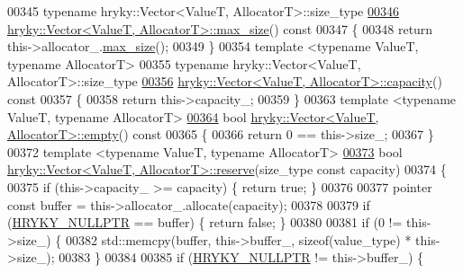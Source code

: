 \begin{DoxyCode}
00345 \textcolor{keyword}{typename} hryky::Vector<ValueT, AllocatorT>::size\_type
\hypertarget{vector_8h_source_l00346}{}\hyperlink{classhryky_1_1_vector_a21d0f3baf14bced98efbf2c23790fd95}{00346} \hyperlink{classhryky_1_1_vector}{hryky::Vector<ValueT, AllocatorT>::max_size}()\textcolor{keyword}{ const}
00347 \textcolor{keyword}{}\{
00348     \textcolor{keywordflow}{return} this->allocator\_.\hyperlink{classhryky_1_1_vector_a21d0f3baf14bced98efbf2c23790fd95}{max_size}();
00349 \}
00354 \textcolor{keyword}{template} <\textcolor{keyword}{typename} ValueT, \textcolor{keyword}{typename} AllocatorT>
00355 \textcolor{keyword}{typename} hryky::Vector<ValueT, AllocatorT>::size\_type
\hypertarget{vector_8h_source_l00356}{}\hyperlink{classhryky_1_1_vector_a0865b1eec33d6dfe008eb7c24afd5f97}{00356} \hyperlink{classhryky_1_1_vector}{hryky::Vector<ValueT, AllocatorT>::capacity}()\textcolor{keyword}{ const}
00357 \textcolor{keyword}{}\{
00358     \textcolor{keywordflow}{return} this->capacity\_;
00359 \}
00363 \textcolor{keyword}{template} <\textcolor{keyword}{typename} ValueT, \textcolor{keyword}{typename} AllocatorT>
\hypertarget{vector_8h_source_l00364}{}\hyperlink{classhryky_1_1_vector_a0aec03015ecda2ed9e59f7a95ee2c81a}{00364} \textcolor{keywordtype}{bool} \hyperlink{classhryky_1_1_vector}{hryky::Vector<ValueT, AllocatorT>::empty}()\textcolor{keyword}{ const}
00365 \textcolor{keyword}{}\{
00366     \textcolor{keywordflow}{return} 0 == this->size\_;
00367 \}
00372 \textcolor{keyword}{template} <\textcolor{keyword}{typename} ValueT, \textcolor{keyword}{typename} AllocatorT>
\hypertarget{vector_8h_source_l00373}{}\hyperlink{classhryky_1_1_vector_a4d2a2874dcc88826b45782d4b1b73051}{00373} \textcolor{keywordtype}{bool} \hyperlink{classhryky_1_1_vector}{hryky::Vector<ValueT, AllocatorT>::reserve}(size\_type \textcolor{keyword}{const} capacity)
00374 \{
00375     \textcolor{keywordflow}{if} (this->capacity\_ >= capacity) \{ \textcolor{keywordflow}{return} \textcolor{keyword}{true}; \}
00376 
00377     pointer \textcolor{keyword}{const} buffer = this->allocator\_.allocate(capacity);
00378 
00379     \textcolor{keywordflow}{if} (\hyperlink{common_8h_a4cd4ac09cfcdbd6b30ee69afc156e210}{HRYKY_NULLPTR} == buffer) \{ \textcolor{keywordflow}{return} \textcolor{keyword}{false}; \}
00380 
00381     \textcolor{keywordflow}{if} (0 != this->size\_) \{
00382         std::memcpy(buffer, this->buffer\_, \textcolor{keyword}{sizeof}(value\_type) * this->size\_);
00383     \}
00384 
00385     \textcolor{keywordflow}{if} (\hyperlink{common_8h_a4cd4ac09cfcdbd6b30ee69afc156e210}{HRYKY_NULLPTR} != this->buffer\_) \{

\end{DoxyCode}

